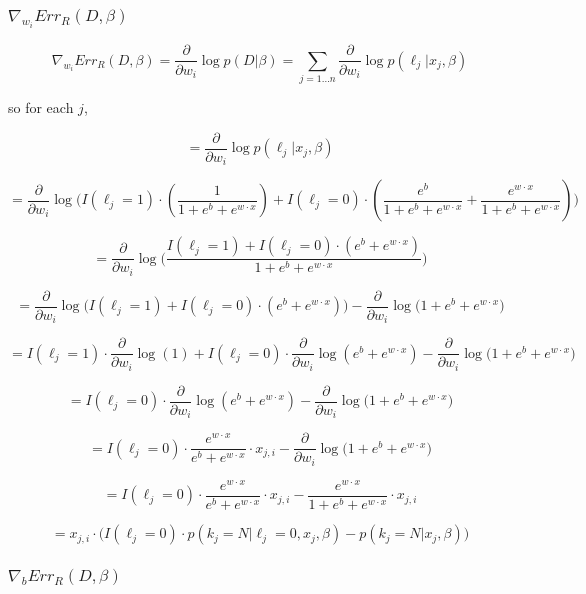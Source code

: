 \documentclass{article}
\begin{document}
\subsubsection{$ \nabla_{w_i}{Err_R (D, \beta)}$}

$$
\nabla_{w_i}{Err_R (D, \beta)} = \frac{\partial}{\partial w_i} \log{p(D|\beta)} =  \sum_{j=1...n}{\frac{\partial}{\partial w_i}\log{p(\ell_j | x_j, \beta)}}
$$

so for each $j$,

$$
 = \frac{\partial}{\partial w_i}\log{p(\ell_j | x_j, \beta)}
$$

$$
 = \frac{\partial}{\partial w_i}
		\log{\Bigg(
			I(\ell_j=1) \cdot \left( \frac{1}{1 + e^b + e^{w \cdot x}} \right) + 
			I(\ell_j=0) \cdot \left(\frac{e^b}{1 + e^b + e^{w \cdot x}} + \frac{e^{w \cdot x}}{1 + e^b + e^{w \cdot x}} \right)
		\Bigg)}
$$

$$
 = \frac{\partial}{\partial w_i}
		\log{\Bigg(
		    \frac{
			I(\ell_j=1) + 
			I(\ell_j=0) \cdot \left( e^b + e^{w \cdot x} \right)
		     }{1 + e^b + e^{w \cdot x}}
		\Bigg)}
$$

$$
 = \frac{\partial}{\partial w_i}
		\log{\bigg(
			I(\ell_j=1) + 
			I(\ell_j=0) \cdot \left( e^b + e^{w \cdot x} \right)
		\bigg)}
		- \frac{\partial}{\partial w_i}
		 \log{\bigg(
			1 + e^b + e^{w \cdot x}
		\bigg)}
$$


$$
 = I(\ell_j=1) \cdot \frac{\partial}{\partial w_i}
		\log{(1)} +
    I(\ell_j=0) \cdot \frac{\partial}{\partial w_i}
		\log{ \left( e^b + e^{w \cdot x} \right) }
		- \frac{\partial}{\partial w_i}
		 \log{\bigg(
			1 + e^b + e^{w \cdot x}
		\bigg)}
$$

$$
 = I(\ell_j=0) \cdot \frac{\partial}{\partial w_i}
		\log{  \left( e^b + e^{w \cdot x} \right) }
		- \frac{\partial}{\partial w_i}
		 \log{\bigg(
			1 + e^b + e^{w \cdot x}
		\bigg)}
$$


$$
 = I(\ell_j=0) \cdot 
 		\frac{
			e^{w \cdot x}
		}{
			e^b + e^{w \cdot x}
		} \cdot x_{j,i}
		- \frac{\partial}{\partial w_i}
		 \log{\Big(
			1 + e^b + e^{w \cdot x}
		\Big)}
$$

$$
 = I(\ell_j=0) \cdot 
 		\frac{
			e^{w \cdot x}
		}{
			e^b + e^{w \cdot x}
		} \cdot x_{j,i}
		- \frac{e^{w \cdot x}}{
			1 + e^b + e^{w \cdot x}
		} \cdot x_{j,i}
$$

$$
 = x_{j,i} \cdot
    \Big(	I(\ell_j=0) \cdot p(k_j=N | \ell_j=0, x_j, \beta) - 
		p(k_j=N | x_j, \beta)
    \Big)
$$

\subsubsection{$ \nabla_{b}{Err_R (D, \beta)}$}
\end{document}
